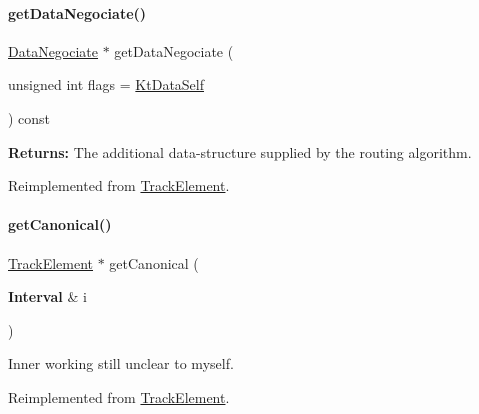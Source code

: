 \mbox{\label{classKite_1_1TrackSegment_acd0170a05128ec4af16ecd0060c3a3b5}} 
\paragraph{\texorpdfstring{get\+Data\+Negociate()}{getDataNegociate()}}
{\footnotesize\ttfamily \hyperlink{classKite_1_1DataNegociate}{Data\+Negociate} $\ast$ get\+Data\+Negociate (\begin{DoxyParamCaption}\item[{unsigned int}]{flags = {\ttfamily \hyperlink{namespaceKite_acca8fffa3182dea5f94208f454f14b47a68e917ff37d4b5cef906303181836404}{Kt\+Data\+Self}} }\end{DoxyParamCaption}) const\hspace{0.3cm}{\ttfamily [virtual]}}

{\bfseries Returns\+:} The additional data-\/structure supplied by the routing algorithm. 

Reimplemented from \hyperlink{classKite_1_1TrackElement_acd0170a05128ec4af16ecd0060c3a3b5}{Track\+Element}.

\mbox{\label{classKite_1_1TrackSegment_af2d46d64cbd02bdbba53d5483d95e26d}} 
\paragraph{\texorpdfstring{get\+Canonical()}{getCanonical()}}
{\footnotesize\ttfamily \hyperlink{classKite_1_1TrackElement}{Track\+Element} $\ast$ get\+Canonical (\begin{DoxyParamCaption}\item[{\textbf{ Interval} \&}]{i }\end{DoxyParamCaption})\hspace{0.3cm}{\ttfamily [virtual]}}

Inner working still unclear to myself. 

Reimplemented from \hyperlink{classKite_1_1TrackElement_af2d46d64cbd02bdbba53d5483d95e26d}{Track\+Element}.


